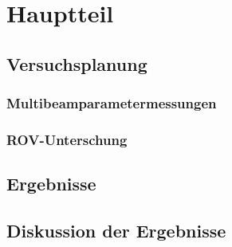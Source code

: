 \documentclass[12pt,titlepage]{scrreprt}
\begin{document}
\tableofcontents

\chapter{Hauptteil}
\section{Versuchsplanung}

%
\subsection{Multibeamparametermessungen}

\subsection{ROV-Unterschung}
%
\section{Ergebnisse}
\section{Diskussion der Ergebnisse}






\end{document}
